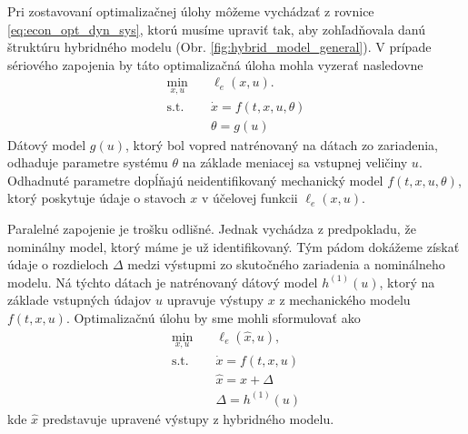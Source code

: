 Pri zostavovaní optimalizačnej úlohy môžeme vychádzať z rovnice \ref{eq:econ_opt_dyn_sys}, ktorú musíme upraviť tak, aby zohľadňovala danú štruktúru hybridného modelu (Obr. \ref{fig:hybrid_model_general}). V prípade sériového zapojenia by táto optimalizačná úloha mohla vyzerať nasledovne
\begin{equation}
	\begin{split}
		\min_{x,u} &\quad \ell_e\left(x,u\right).\\
		\text{s.t.} &\quad \dot{x} = f\left(t,x,u,\theta\right)\\
		&\quad \theta = g(u)
	\end{split}
\end{equation}
Dátový model $ g(u) $, ktorý bol vopred natrénovaný na dátach zo zariadenia, odhaduje parametre systému $ \theta $ na základe meniacej sa vstupnej veličiny $ u $. Odhadnuté parametre dopĺňajú
neidentifikovaný mechanický model $ f(t,x,u,\theta) $, ktorý poskytuje údaje o stavoch $ x $ v účelovej funkcii $ \ell_e\left(x,u\right) $. 

Paralelné zapojenie je trošku odlišné. Jednak vychádza z predpokladu, že nominálny model, ktorý máme je už identifikovaný. Tým pádom dokážeme získať údaje o rozdieloch $ \Delta $ medzi výstupmi zo skutočného zariadenia a nominálneho modelu. Ná týchto dátach je natrénovaný dátový model $ h^{(1)}(u) $, ktorý na základe vstupných údajov $ u $ upravuje výstupy $ x $ z mechanického modelu $ f(t,x,u) $. Optimalizačnú úlohu by sme mohli sformulovať ako
\begin{equation}
	\begin{split}
		\min_{x,u} &\quad \ell_e\left(\hat{x},u\right),\\
		\text{s.t.} &\quad \dot{x} = f\left(t,x,u\right)\\
		&\quad \hat{x} = x + \Delta\\
		&\quad \Delta = h^{(1)}(u)
	\end{split}
\end{equation}
kde $ \hat{x} $ predstavuje upravené výstupy z hybridného modelu.

